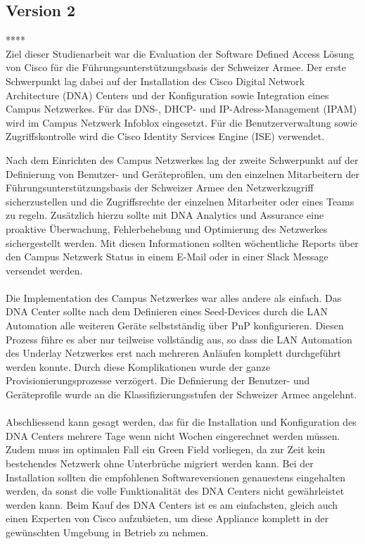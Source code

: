 \subsection{Version 2}

**** \\
Ziel dieser Studienarbeit war die Evaluation der Software Defined Access Lösung von Cisco für die Führungsunterstützungsbasis der Schweizer Armee. Der erste Schwerpunkt lag dabei auf der Installation des Cisco Digital Network Architecture (DNA) Centers und der Konfiguration sowie Integration eines Campus Netzwerkes. Für das DNS-, DHCP- und IP-Adress-Management (IPAM) wird im Campus Netzwerk Infoblox eingesetzt. Für die Benutzerverwaltung sowie Zugriffskontrolle wird die Cisco Identity Services Engine (ISE) verwendet.

Nach dem Einrichten des Campus Netzwerkes lag der zweite Schwerpunkt auf der Definierung von Benutzer- und Geräteprofilen, um den einzelnen Mitarbeitern der Führungsunterstützungsbasis der Schweizer Armee den Netzwerkzugriff sicherzustellen und die Zugriffsrechte der einzelnen Mitarbeiter oder eines Teams zu regeln. Zusätzlich hierzu sollte mit DNA Analytics und Assurance eine proaktive Überwachung, Fehlerbehebung und Optimierung des Netzwerkes sichergestellt werden. Mit diesen Informationen sollten wöchentliche Reports über den Campus Netzwerk Status in einem E-Mail oder in einer Slack Message versendet werden.\\
\\
Die Implementation des Campus Netzwerkes war alles andere als einfach. Das DNA Center sollte nach dem Definieren eines Seed-Devices durch die LAN Automation alle weiteren Geräte selbstständig über PnP konfigurieren. Diesen Prozess führe es aber nur teilweise vollständig aus, so dass die LAN Automation des Underlay Netzwerkes erst nach mehreren Anläufen komplett durchgeführt werden konnte. Durch diese Komplikationen wurde der ganze Provisionierungsprozesse verzögert. Die Definierung der Benutzer- und Geräteprofile wurde an die Klassifizierungsstufen der Schweizer Armee angelehnt.\\
\\
Abschliessend kann gesagt werden, das für die Installation und Konfiguration des DNA Centers mehrere Tage wenn nicht Wochen eingerechnet werden müssen. Zudem muss im optimalen Fall ein Green Field vorliegen, da zur Zeit kein bestehendes Netzwerk ohne Unterbrüche migriert werden kann. Bei der Installation sollten die empfohlenen Softwareversionen genauestens eingehalten werden, da sonst die volle Funktionalität des DNA Centers nicht gewährleistet werden kann. Beim Kauf des DNA Centers ist es am einfachsten, gleich auch einen Experten von Cisco aufzubieten, um diese Appliance komplett in der gewünschten Umgebung in Betrieb zu nehmen. 


